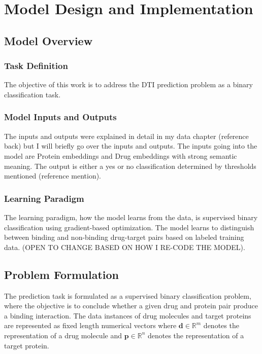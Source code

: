 \chapter{Model Design and Implementation}
\section{Model Overview}
\subsection{Task Definition}
The objective of this work is to address the DTI prediction problem as a binary classification task.

\subsection{Model Inputs and Outputs}
The inputs and outputs were explained in detail in my data chapter (reference back) but I will briefly go over the inputs and outputs. The inputs going into the model are Protein embeddings and Drug embeddings with strong semantic meaning. The output is either a yes or no classification determined by thresholds mentioned (reference mention).

\subsection{Learning Paradigm}
The learning paradigm, how the model learns from the data, is supervised binary classification using gradient-based optimization. The model learns to distinguish between binding and non-binding drug-target pairs based on labeled training data. (OPEN TO CHANGE BASED ON HOW I RE-CODE THE MODEL). 

\section{Problem Formulation}
The prediction task is formulated as a supervised binary classification problem, where the objective is to conclude whether a given drug and protein pair produce a binding interaction. The data instances of drug molecules and target proteins are represented as fixed length numerical vectors where $\mathbf{d} \in \mathbb{R}^{m}$ denotes the representation of a drug molecule and $\mathbf{p} \in \mathbb{R}^{n}$ denotes the representation of a target protein.

